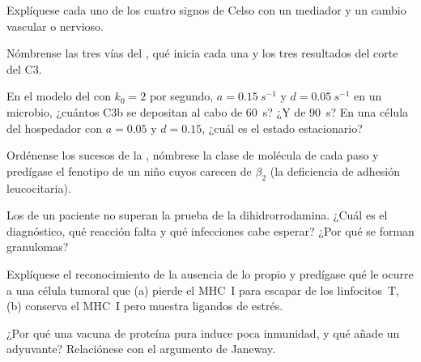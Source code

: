 \begin{exercise}[$\star$]\label{exo:b3:innate-immunity:3}
Explíquese cada uno de los cuatro signos de Celso con un mediador y un
cambio vascular o nervioso.
\end{exercise}

\begin{exercise}[$\star$]\label{exo:b3:innate-immunity:4}
Nómbrense las tres vías del , qué inicia cada una y los tres
resultados del corte del C3.
\end{exercise}

\begin{exercise}[$\star\star$]\label{exo:b3:innate-immunity:5}
En el modelo del  con $k_{0} = 2$ por segundo, $a =
\qty{0.15}{s^{-1}}$ y $d = \qty{0.05}{s^{-1}}$ en un microbio, ¿cuántos
C3b se depositan al cabo de \qty{60}{s}? ¿Y de \qty{90}{s}? En una célula
del hospedador con $a = 0.05$ y $d = 0.15$, ¿cuál es el estado
estacionario?
\end{exercise}

\begin{exercise}[$\star\star$]\label{exo:b3:innate-immunity:6}
Ordénense los sucesos de la , nómbrese la clase de molécula
de cada paso y predígase el fenotipo de un niño cuyos  carecen
de  $\beta_{2}$ (la deficiencia de adhesión leucocitaria).
\end{exercise}

\begin{exercise}[$\star\star$]\label{exo:b3:innate-immunity:7}
Los  de un paciente no superan la prueba de la
dihidrorrodamina. ¿Cuál es el diagnóstico, qué reacción falta y qué
infecciones cabe esperar? ¿Por qué se forman granulomas?
\end{exercise}

\begin{exercise}[$\star\star$]\label{exo:b3:innate-immunity:8}
Explíquese el reconocimiento de la ausencia de lo propio y predígase qué
le ocurre a una célula tumoral que (a) pierde el MHC~I para escapar de
los linfocitos~T, (b) conserva el MHC~I pero muestra ligandos de estrés.
\end{exercise}

\begin{exercise}[$\star\star$]\label{exo:b3:innate-immunity:9}
¿Por qué una vacuna de proteína pura induce poca inmunidad, y qué añade
un adyuvante? Relaciónese con el argumento de Janeway.
\end{exercise}

